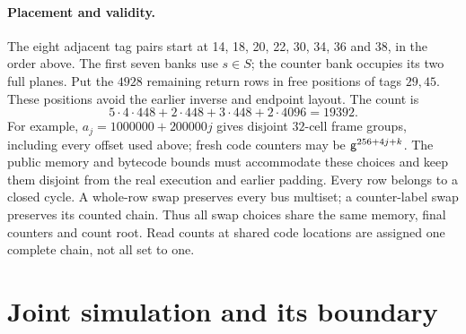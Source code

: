 \documentclass[11pt]{article}
\begin{document}
\paragraph{Placement and validity.} The eight adjacent tag pairs start at 14, 18, 20, 22, 30, 34, 36 and 38, in the order above. The first seven banks use $s\in S$; the counter bank occupies its two full planes. Put the $4928$ remaining return rows in free positions of tags $29,45$. These positions avoid the earlier inverse and endpoint layout. The count is
\[
 5\cdot4\cdot448+2\cdot448+3\cdot448+2\cdot4096=19392.
\]
For example, $a_j=1000000+200000j$ gives disjoint $32$-cell frame groups, including every offset used above; fresh code counters may be $\mathsf{g}^{256+4j+k}$. The public memory and bytecode bounds must accommodate these choices and keep them disjoint from the real execution and earlier padding. Every row belongs to a closed cycle. A whole-row swap preserves every bus multiset; a counter-label swap preserves its counted chain. Thus all swap choices share the same memory, final counters and count root. Read counts at shared code locations are assigned one complete chain, not all set to one.

\section{Joint simulation and its boundary}
\end{document}
